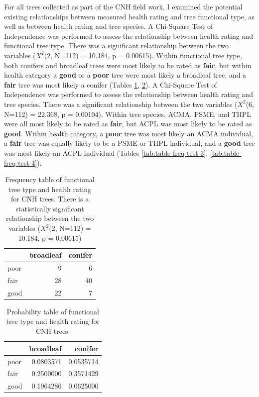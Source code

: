 \documentclass[12pt,twoside]{reedthesis}
\begin{document}
For all trees collected as part of the CNH field work, I examined the
potential existing relationships between measured health rating and tree
functional type, as well as between health rating and tree species. A
Chi-Square Test of Independence was performed to assess the relationship
between health rating and functional tree type. There was a significant
relationship between the two variables (\(X^2\)(2, N=112) = 10.184, p =
0.00615). Within functional tree type, both conifers and broadleaf trees
were most likely to be rated as \textbf{fair}, but within health category a
\textbf{good} or a \textbf{poor} tree were most likely a broadleaf tree, and a
\textbf{fair} tree was most likely a conifer (Tables
\ref{tab:table-freq-test-1}, \ref{tab:table-freq-test-2}). A
Chi-Square Test of Independence was performed to assess the relationship
between health rating and tree species. There was a significant
relationship between the two variables (\(X^2\)(6, N=112) = 22.368, p =
0.00104). Within tree species, ACMA, PSME, and THPL were all most likely
to be rated as \textbf{fair}, but ACPL was most likely to be rated as
\textbf{good}. Within health category, a \textbf{poor} tree was most likely an
ACMA individual, a \textbf{fair} tree was equally likely to be a PSME or THPL
individual, and a \textbf{good} tree was most likely an ACPL individual
(Tables \ref{tab:table-freq-test-3}, \ref{tab:table-freq-test-4}).
\begin{longtable}[t]{lrr}
\caption[Frequency table of functional tree type and health rating for CNH trees]{\label{tab:table-freq-test-1}Frequency table of functional tree type and health rating for CNH trees. There is a statistically significant relationship between the two variables ($X^2$(2, N=112) = 10.184, p = 0.00615)}\\
\toprule
  & broadleaf & conifer\\
\midrule
poor & 9 & 6\\
fair & 28 & 40\\
good & 22 & 7\\
\bottomrule
\end{longtable}
\begin{longtable}[t]{lrr}
\caption[Probability table of functional tree type and health rating for CNH trees]{\label{tab:table-freq-test-2}Probability table of functional tree type and health rating for CNH trees. }\\
\toprule
  & broadleaf & conifer\\
\midrule
poor & 0.0803571 & 0.0535714\\
fair & 0.2500000 & 0.3571429\\
good & 0.1964286 & 0.0625000\\
\bottomrule
\end{longtable}
\end{document}
